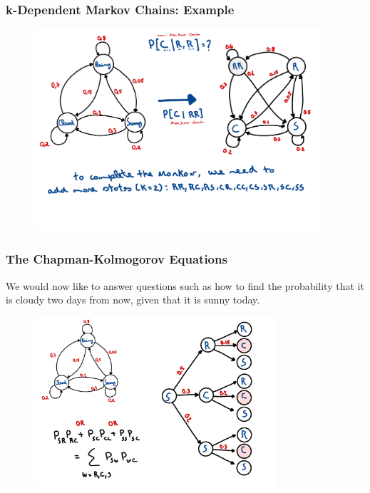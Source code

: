 \begin{frame}
    \frametitle{k-Dependent Markov Chains: Example}
    \begin{figure}
        \centering
        \includegraphics[width=0.95\textwidth]{slides/figures/markov_chain_k_dependent_example.pdf}
    \end{figure}
\end{frame}




\begin{frame}
    \frametitle{The Chapman-Kolmogorov Equations}
        We would now like to answer questions such as how to find the probability that it is cloudy two 
        days from now, given that it is sunny today.
        \begin{figure}
            \centering
            \includegraphics[width=0.8\textwidth]{slides/figures/markov_chain_2_steps_after_example.pdf}
        \end{figure}
\end{frame}


